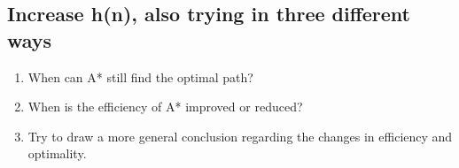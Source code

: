 \documentclass{article}
\begin{document}
\subsection{Increase h(n), also trying in three different ways}
\begin{enumerate}[label=(\alph*)]
    \item When can A* still find the optimal path?
    \item When is the efficiency of A* improved or reduced? 
    \item Try to draw a more general conclusion regarding the changes in efficiency and optimality.
\end{enumerate}
\end{document}

